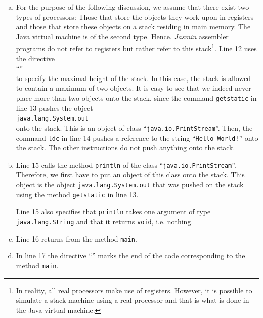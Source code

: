 \begin{enumerate}
\begin{enumerate}[(a)]
  \item For the purpose of the following discussion, we assume that there exist two types of
        processors: Those that store the objects they work upon in registers and those that store
        these objects on a stack residing in main memory.  The Java virtual machine is of the second
        type.  Hence, \textsl{Jasmin} assembler programs do not refer to registers but rather refer to
        this stack\footnote{
          In reality, all real processors make use of registers.  However, it is possible 
          to simulate a stack machine using a real processor and that is what is done in the Java
          virtual machine.}.
        Line 12 uses the directive
        \\[0.2cm]
        \hspace*{1.3cm}
        ``\texttt{}''
        \\[0.2cm]
        to specify the maximal height of the
        stack.  In this case, the stack is allowed to contain a maximum of two objects.  It is easy
        to see that we indeed never place more than two objects onto the stack, since the command
        \texttt{getstatic} in line 13 pushes the object 
        \\[0.2cm]
        \hspace*{1.3cm}
        \texttt{java.lang.System.out}
        \\[0.2cm]
        onto the stack.  This is an object of class ``\texttt{java.io.PrintStream}''.
        Then, the command \texttt{ldc} in line 14 pushes a reference to the string ``\texttt{Hello World!}'' onto the stack.
        The other instructions do not push anything onto the stack.
  \item Line 15 calls the method \texttt{println} of the class ``\texttt{java.io.PrintStream}''.
        Therefore, we first have to put an object of this class onto the stack.  This object is the object
        \texttt{java.lang.System.out} that was  pushed on the stack using the method \texttt{getstatic} in
        line 13.

        Line 15 also specifies that \texttt{println} takes one argument of
        type \texttt{java.lang.String} and that it returns \texttt{void}, i.e. nothing.

  \item Line 16 returns from the method \texttt{main}.
  \item In line 17 the directive ``\texttt{}''  marks the end of the code corresponding to the method 
        \texttt{main}.
  \end{enumerate}
\end{enumerate}
